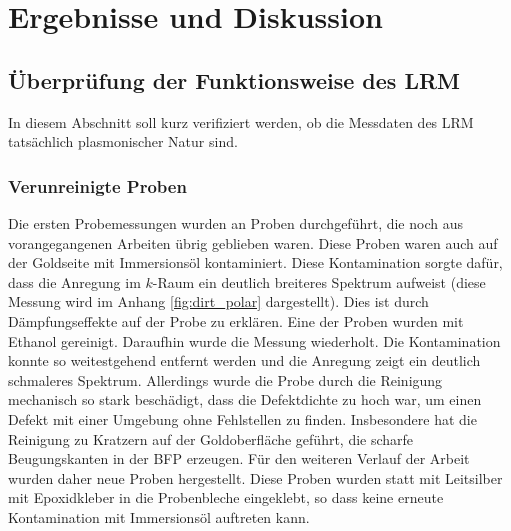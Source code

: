 \documentclass[titlepage]{article}
\begin{document}
	\section{Ergebnisse und Diskussion}
	\subsection{Überprüfung der Funktionsweise des LRM}
	In diesem Abschnitt soll kurz verifiziert werden, ob die Messdaten des LRM tatsächlich plasmonischer Natur sind.
	\subsubsection{Verunreinigte Proben}
	Die ersten Probemessungen wurden an Proben durchgeführt, die noch aus vorangegangenen Arbeiten übrig geblieben waren. Diese Proben waren auch auf der Goldseite mit Immersionsöl kontaminiert. Diese Kontamination sorgte dafür, dass die Anregung im $k$-Raum ein deutlich breiteres Spektrum aufweist (diese Messung wird im Anhang \ref{fig:dirt_polar} dargestellt). Dies ist durch Dämpfungseffekte auf der Probe zu erklären. Eine der Proben wurden mit Ethanol gereinigt. Daraufhin wurde die Messung wiederholt. Die Kontamination konnte so weitestgehend entfernt werden und die Anregung zeigt ein deutlich schmaleres Spektrum. Allerdings wurde die Probe durch die Reinigung mechanisch so stark beschädigt, dass die Defektdichte zu hoch war, um einen Defekt mit einer Umgebung ohne Fehlstellen zu finden. Insbesondere hat die Reinigung zu Kratzern auf der Goldoberfläche geführt, die scharfe Beugungskanten in der BFP  erzeugen. Für den weiteren Verlauf der Arbeit wurden daher neue Proben hergestellt. Diese Proben wurden statt mit Leitsilber mit Epoxidkleber in die Probenbleche eingeklebt, so dass keine erneute Kontamination mit Immersionsöl auftreten kann.
\end{document}
